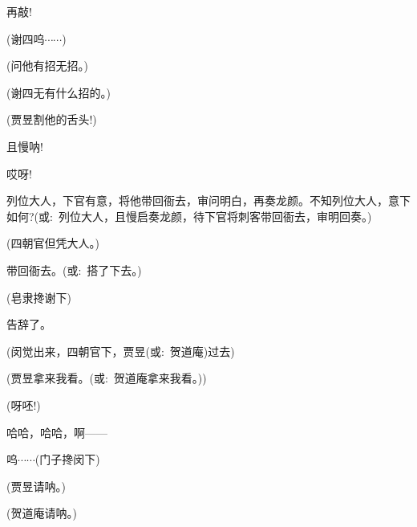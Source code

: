 {再敲!

(谢四\hspace{30pt}呜$\cdots{}\cdots{}$)

(问他有招无招。)

(谢四\hspace{30pt}无有什么招的。)

(贾昱\hspace{30pt}割他的舌头!)

且慢呐!

哎呀!



列位大人，下官有意，将他带回衙去，审问明白，再奏龙颜。不知列位大人，意下如何?({\akai 或}:~列位大人，且慢启奏龙颜，待下官将刺客带回衙去，审明回奏。)

(四朝官\hspace{20pt}但凭大人。)

带回衙去。({\akai 或}:~搭了下去。)

(皂隶{\hwfs 搀}谢{\hwfs 下})

告辞了。


(闵觉{\hwfs 出来}，{\hwfs 四}朝官{\hwfs 下}，贾昱({\akai 或}:~贺道庵){\hwfs 过去})

(贾昱\hspace{30pt}拿来我看。({\akai 或}:~贺道庵\hspace{20pt}拿来我看。))

(呀呸!)


哈哈，哈哈，啊------

呜$\cdots{}\cdots{}$(门子{\hwfs 搀}闵{\hwfs 下})

(贾昱\hspace{30pt}请呐。)

(贺道庵\hspace{20pt}请呐。)

}
